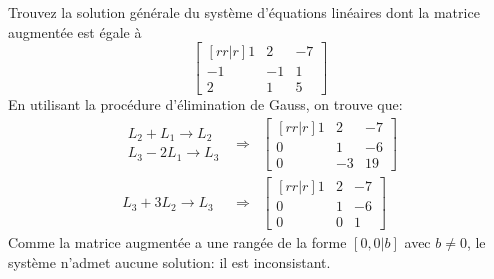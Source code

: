 \begin{exemple}
	Trouvez la solution générale du système d'équations linéaires dont la matrice augmentée est égale à
	\[
	\begin{bmatrix}[rr|r]
	1 & 2 & -7 \\
	-1 & -1 & 1\\
	2 & 1 & 5
	\end{bmatrix}
	\]
	\solution
	En utilisant la procédure d'élimination de Gauss, on trouve que:
	\[
	\begin{matrix}
		\begin{matrix}
		L_2 + L_1 \rightarrow L_2 \\
		L_3 -2L_1 \rightarrow L_3
		\end{matrix}
		&\Longrightarrow&
		\begin{bmatrix}[rr|r]
		1 & 2 & -7 \\
		0 & 1 & -6\\
		0 & -3 & 19
		\end{bmatrix}
	\\[20pt]
		L_3 + 3L_2 \rightarrow L_3
		&\Longrightarrow&
		\begin{bmatrix}[rr|r]
		1 & 2 & -7 \\
		0 & 1 & -6\\
		0 & 0 & 1
		\end{bmatrix}
	\end{matrix}
	\]
	Comme la matrice augmentée a une rangée de la forme $[0, 0 | b]$ avec $b\ne 0$, le système n'admet aucune solution: il
	est inconsistant.
\end{exemple}

